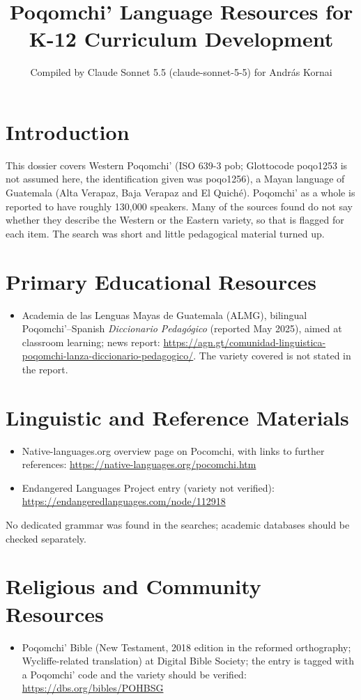 \documentclass[12pt]{article}
\title{Poqomchi' Language Resources for K-12 Curriculum Development}
\author{Compiled by Claude Sonnet 5.5 (claude-sonnet-5-5) for Andr\'as Kornai}
\date{}
\begin{document}
\maketitle

\section{Introduction}
This dossier covers Western Poqomchi' (ISO 639-3 pob; Glottocode poqo1253 is not assumed here, the identification given was poqo1256), a Mayan language of Guatemala (Alta Verapaz, Baja Verapaz and El Quich\'e). Poqomchi' as a whole is reported to have roughly 130,000 speakers. Many of the sources found do not say whether they describe the Western or the Eastern variety, so that is flagged for each item. The search was short and little pedagogical material turned up.

\section{Primary Educational Resources}
\begin{itemize}
\item Academia de las Lenguas Mayas de Guatemala (ALMG), bilingual Poqomchi'--Spanish \emph{Diccionario Pedag\'ogico} (reported May 2025), aimed at classroom learning; news report: \url{https://agn.gt/comunidad-linguistica-poqomchi-lanza-diccionario-pedagogico/}. The variety covered is not stated in the report.
\end{itemize}

\section{Linguistic and Reference Materials}
\begin{itemize}
\item Native-languages.org overview page on Pocomchi, with links to further references: \url{https://native-languages.org/pocomchi.htm}
\item Endangered Languages Project entry (variety not verified): \url{https://endangeredlanguages.com/node/112918}
\end{itemize}
No dedicated grammar was found in the searches; academic databases should be checked separately.

\section{Religious and Community Resources}
\begin{itemize}
\item Poqomchi' Bible (New Testament, 2018 edition in the reformed orthography; Wycliffe-related translation) at Digital Bible Society; the entry is tagged with a Poqomchi' code and the variety should be verified: \url{https://dbs.org/bibles/POHBSG}
\end{itemize}
\end{document}
